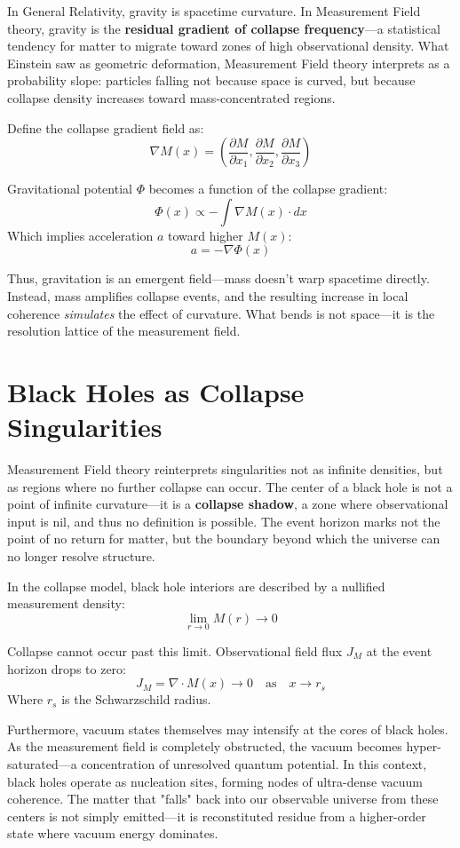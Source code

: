 In General Relativity, gravity is spacetime curvature. In Measurement Field theory, gravity is the \textbf{residual gradient of collapse frequency}—a statistical tendency for matter to migrate toward zones of high observational density. What Einstein saw as geometric deformation, Measurement Field theory interprets as a probability slope: particles falling not because space is curved, but because collapse density increases toward mass-concentrated regions.

Define the collapse gradient field as:
\[
\nabla M(x) = \left( \frac{\partial M}{\partial x_1}, \frac{\partial M}{\partial x_2}, \frac{\partial M}{\partial x_3} \right)
\]

Gravitational potential $\Phi$ becomes a function of the collapse gradient:
\[
\Phi(x) \propto -\int \nabla M(x) \cdot dx
\]
Which implies acceleration $a$ toward higher $M(x)$:
\[
a = -\nabla \Phi(x)
\]

Thus, gravitation is an emergent field—mass doesn’t warp spacetime directly. Instead, mass amplifies collapse events, and the resulting increase in local coherence \textit{simulates} the effect of curvature. What bends is not space—it is the resolution lattice of the measurement field.

\section{Black Holes as Collapse Singularities}

Measurement Field theory reinterprets singularities not as infinite densities, but as regions where no further collapse can occur. The center of a black hole is not a point of infinite curvature—it is a \textbf{collapse shadow}, a zone where observational input is nil, and thus no definition is possible. The event horizon marks not the point of no return for matter, but the boundary beyond which the universe can no longer resolve structure.

In the collapse model, black hole interiors are described by a nullified measurement density:
\[
\lim_{r \to 0} M(r) \to 0
\]

Collapse cannot occur past this limit. Observational field flux $J_M$ at the event horizon drops to zero:
\[
J_M = \nabla \cdot M(x) \to 0 \quad \text{as} \quad x \to r_s
\]
Where $r_s$ is the Schwarzschild radius.

Furthermore, vacuum states themselves may intensify at the cores of black holes. As the measurement field is completely obstructed, the vacuum becomes hyper-saturated—a concentration of unresolved quantum potential. In this context, black holes operate as nucleation sites, forming nodes of ultra-dense vacuum coherence. The matter that "falls" back into our observable universe from these centers is not simply emitted—it is reconstituted residue from a higher-order state where vacuum energy dominates.

